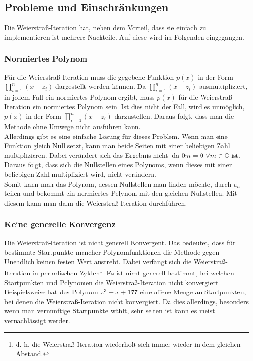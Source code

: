 \documentclass[12pt]{article}
\begin{document}
\subsection{Probleme und Einschränkungen}
Die Weierstraß-Iteration hat, neben dem Vorteil, dass sie einfach zu implementieren ist mehrere Nachteile. Auf diese wird im Folgenden eingegangen.
\subsubsection{Normiertes Polynom}
Für die Weierstraß-Iteration muss die gegebene Funktion $p(x)$ in der Form $\prod_{i=1}^n (x-z_i)$ dargestellt werden können. Da $\prod_{i=1}^n (x-z_i)$ ausmultipliziert, in jedem Fall ein normiertes Polynom ergibt, muss $p(x)$ für die Weierstraß-Iteration ein normiertes Polynom sein.
Ist dies nicht der Fall, wird es unmöglich, $p(x)$ in der Form $\prod_{i=1}^n (x-z_i)$ darzustellen. Daraus folgt, dass man die Methode ohne Umwege nicht ausführen kann. \\
Allerdings gibt es eine einfache Lösung für dieses Problem. Wenn man eine Funktion gleich Null setzt, kann man beide Seiten mit einer beliebigen Zahl multiplizieren. Dabei verändert sich das Ergebnis nicht, da $0m = 0$ \space $\forall m \in \mathbb{C}$ ist. Daraus folgt, dass sich die Nullstellen eines Polynoms, wenn dieses mit einer beliebigen Zahl multipliziert wird, nicht verändern. \\
Somit kann man das Polynom, dessen Nullstellen man finden möchte, durch $a_n$ teilen und bekommt ein normiertes Polynom mit den gleichen Nullstellen. Mit diesem kann man dann die Weierstraß-Iteration durchführen.

\subsubsection{Keine generelle Konvergenz}
Die Weierstraß-Iteration ist nicht generell Konvergent. Das bedeutet, dass für bestimmte Startpunkte mancher Polynomfunktionen die Methode gegen Unendlich keinen festen Wert anstrebt. Dabei verfängt sich die Weierstraß-Iteration in periodischen Zyklen\footnote{d. h. die Weierstraß-Iteration wiederholt sich immer wieder in dem gleichen Abstand.}. Es ist nicht generell bestimmt, bei welchen Startpunkten und Polynomen die Weierstraß-Iteration nicht konvergiert. Beispielsweise hat das Polynom $x^3+x+177$ eine offene Menge an Startpunkten, bei denen die Weierstraß-Iteration nicht konvergiert. Da dies allerdings, besonders wenn man vernünftige Startpunkte wählt, sehr selten ist kann es meist vernachlässigt werden. 
\end{document}
